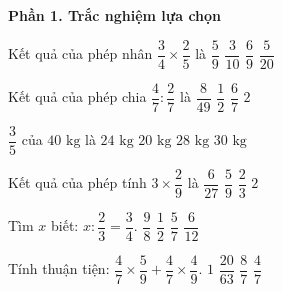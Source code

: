 \textbf{Phần 1. Trắc nghiệm lựa chọn}

\begin{ex} %
Kết quả của phép nhân $\dfrac{3}{4} \times \dfrac{2}{5}$ là
\choice
{$\dfrac{5}{9}$}
{\True $\dfrac{3}{10}$}
{$\dfrac{6}{9}$}
{$\dfrac{5}{20}$}
\end{ex}

\begin{ex} %
Kết quả của phép chia $\dfrac{4}{7} : \dfrac{2}{7}$ là
\choice
{$\dfrac{8}{49}$}
{$\dfrac{1}{2}$}
{$\dfrac{6}{7}$}
{\True $2$}
\end{ex}

\begin{ex} %
$\dfrac{3}{5}$ của $40\text{ kg}$ là
\choice
{\True $24\text{ kg}$}
{$20\text{ kg}$}
{$28\text{ kg}$}
{$30\text{ kg}$}
\end{ex}

\begin{ex} %
Kết quả của phép tính $3 \times \dfrac{2}{9}$ là
\choice
{$\dfrac{6}{27}$}
{$\dfrac{5}{9}$}
{\True $\dfrac{2}{3}$}
{$2$}
\end{ex}

\begin{ex} %
Tìm $x$ biết: $x : \dfrac{2}{3} = \dfrac{3}{4}$.
\choice
{$\dfrac{9}{8}$}
{\True $\dfrac{1}{2}$}
{$\dfrac{5}{7}$}
{$\dfrac{6}{12}$}
\end{ex}

\begin{ex} %
Tính thuận tiện: $\dfrac{4}{7} \times \dfrac{5}{9} + \dfrac{4}{7} \times \dfrac{4}{9}$.
\choice
{$1$}
{$\dfrac{20}{63}$}
{$\dfrac{8}{7}$}
{\True $\dfrac{4}{7}$}
\end{ex}

